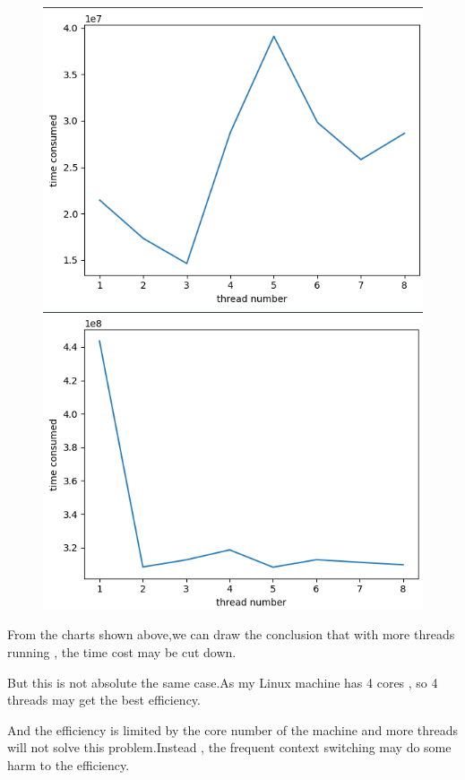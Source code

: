 \documentclass[]{article}
\begin{document}
\begin{figure}[H]
    \includegraphics[scale = 0.6]{2023-03-25-13-58-44.png}
    \includegraphics[scale = 0.6]{2023-03-25-13-59-00.png}
\end{figure}

From the charts shown above,we can draw the conclusion that with more threads running , the time cost may be cut down.\par
But this is not absolute the same case.As my Linux machine has 4 cores , so 4 threads may get the best efficiency.\par 
And the efficiency is limited by the core number of the machine and more threads will not solve this problem.Instead , the frequent context switching may do some harm to the efficiency.\par 
\end{document}
